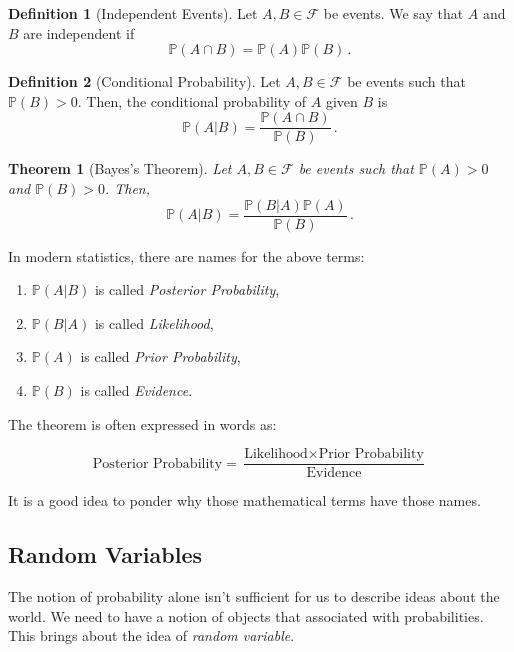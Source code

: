 \documentclass[
  openany]{book}
\newtheorem{theorem}{Theorem}[chapter]
\theoremstyle{definition}
\newtheorem{definition}{Definition}[chapter]
\theoremstyle{definition}
\theoremstyle{definition}
\theoremstyle{definition}
\theoremstyle{remark}
\begin{document}
\begin{definition}[Independent Events]
Let \(A, B \in \mathcal{F}\) be events. We say that \(A\) and \(B\) are independent
if
\[ \mathbb{P}(A \cap B) = \mathbb{P}(A) \mathbb{P}(B)  \,. \]
\end{definition}

\begin{definition}[Conditional Probability]
Let \(A, B \in \mathcal{F}\) be events such that \(\mathbb{P}(B) >0\). Then, the conditional probability of
\(A\) given \(B\) is
\[ \mathbb{P}(A \vert B) = \frac{\mathbb{P}(A \cap B)}{\mathbb{P}(B)} \,. \]
\end{definition}

\begin{theorem}[Bayes's Theorem]
Let \(A, B \in \mathcal{F}\) be events such that \(\mathbb{P}(A)>0\) and \(\mathbb{P}(B) >0\).
Then,
\[\mathbb{P}(A | B) = \frac{\mathbb{P}(B | A) \mathbb{P}(A)}{\mathbb{P}(B)} \,.\]
\end{theorem}

In modern statistics, there are names for the above terms:

\begin{enumerate}
\def\labelenumi{\arabic{enumi}.}
\item
  \(\mathbb{P}(A | B)\) is called \emph{Posterior Probability},
\item
  \(\mathbb{P}(B | A)\) is called \emph{Likelihood},
\item
  \(\mathbb{P}(A)\) is called \emph{Prior Probability},
\item
  \(\mathbb{P}(B)\) is called \emph{Evidence}.
\end{enumerate}

The theorem is often expressed in words as:

\[ \text{Posterior Probability} = \frac{\text{Likelihood} \times \text{Prior Probability}}{\text{Evidence}} \]

It is a good idea to ponder why those mathematical terms have those names.

\subsection{Random Variables}\label{random-variables}

The notion of probability alone isn't sufficient for us to describe ideas about the world.
We need to have a notion of objects that associated with probabilities.
This brings about the idea of \emph{random variable}.
\end{document}
